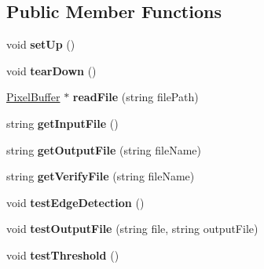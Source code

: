 \subsection*{Public Member Functions}
\begin{DoxyCompactItemize}
\item 
\hypertarget{classFilterToolTest_a7118243f3c0cbbeeaa63afa2a28afbdb}{void {\bfseries set\-Up} ()}\label{classFilterToolTest_a7118243f3c0cbbeeaa63afa2a28afbdb}

\item 
\hypertarget{classFilterToolTest_a504ad5f4dff73d0d28174aeb4579e7be}{void {\bfseries tear\-Down} ()}\label{classFilterToolTest_a504ad5f4dff73d0d28174aeb4579e7be}

\item 
\hypertarget{classFilterToolTest_a11ecc9ffbaea30b9b614b0eb0b9e6809}{\hyperlink{classPixelBuffer}{Pixel\-Buffer} $\ast$ {\bfseries read\-File} (string file\-Path)}\label{classFilterToolTest_a11ecc9ffbaea30b9b614b0eb0b9e6809}

\item 
\hypertarget{classFilterToolTest_abf87ae201ad787773d9dc5b21813e0d3}{string {\bfseries get\-Input\-File} ()}\label{classFilterToolTest_abf87ae201ad787773d9dc5b21813e0d3}

\item 
\hypertarget{classFilterToolTest_a711c3299ced93a3a997efa5caca6138d}{string {\bfseries get\-Output\-File} (string file\-Name)}\label{classFilterToolTest_a711c3299ced93a3a997efa5caca6138d}

\item 
\hypertarget{classFilterToolTest_a7197998e31e539b21b150471dfca6f9d}{string {\bfseries get\-Verify\-File} (string file\-Name)}\label{classFilterToolTest_a7197998e31e539b21b150471dfca6f9d}

\item 
\hypertarget{classFilterToolTest_a1fa65c57dc84ed19daccdfea6361a33f}{void {\bfseries test\-Edge\-Detection} ()}\label{classFilterToolTest_a1fa65c57dc84ed19daccdfea6361a33f}

\item 
\hypertarget{classFilterToolTest_add51010398df3f598487eecfd7670a20}{void {\bfseries test\-Output\-File} (string file, string output\-File)}\label{classFilterToolTest_add51010398df3f598487eecfd7670a20}

\item 
\hypertarget{classFilterToolTest_ab8489f7e7d0c309e66d967dba2cb4df4}{void {\bfseries test\-Threshold} ()}\label{classFilterToolTest_ab8489f7e7d0c309e66d967dba2cb4df4}


\end{DoxyCompactItemize}
